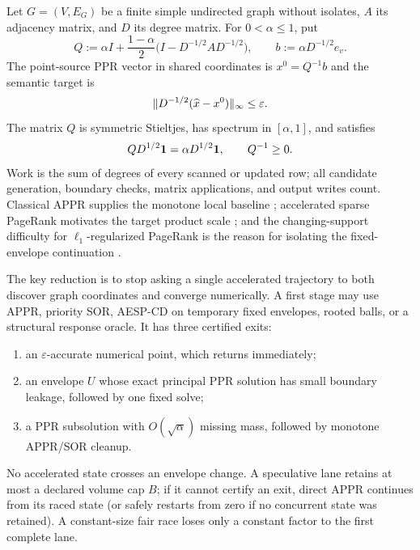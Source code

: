 Let $G=(V,E_G)$ be a finite simple undirected graph without isolates,
$A$ its adjacency matrix, and $D$ its degree matrix.  For
$0<\alpha\leq1$, put
\begin{equation}
 Q:=\alpha I+\frac{1-\alpha}{2}
      \bigl(I-D^{-1/2}AD^{-1/2}\bigr),
 \qquad b:=\alpha D^{-1/2}e_v.
 \label{eq:short-q}
\end{equation}
The point-source PPR vector in shared coordinates is $x^0=Q^{-1}b$ and the
semantic target is
\begin{equation}
 \lVert D^{-1/2}(\widehat x-x^0)\rVert_\infty\leq\varepsilon.
 \label{eq:short-target}
\end{equation}
The matrix $Q$ is symmetric Stieltjes, has spectrum in $[\alpha,1]$, and
satisfies
\begin{equation}
 QD^{1/2}\mathbf{1}=\alpha D^{1/2}\mathbf{1},
 \qquad Q^{-1}\geq0.
 \label{eq:short-comparison}
\end{equation}
Work is the sum of degrees of every scanned or updated row; all candidate
generation, boundary checks, matrix applications, and output writes count.
Classical APPR supplies the monotone local baseline
\citep{andersen2007using}; accelerated sparse PageRank motivates the target
product scale \citep{martinezrubio2023accelerated,huang2025accelerated}; and
the changing-support difficulty for $\ell_1$-regularized PageRank is the
reason for isolating the fixed-envelope continuation
\citep{fountoulakis2026complexity}.

The key reduction is to stop asking a single accelerated trajectory to both
discover graph coordinates and converge numerically.  A first stage may use
APPR, priority SOR, AESP-CD on temporary fixed envelopes, rooted balls, or a
structural response oracle.  It has three certified exits:
\begin{enumerate}[leftmargin=2.2em]
\item an $\varepsilon$-accurate numerical point, which returns immediately;
\item an envelope $U$ whose exact principal PPR solution has small boundary
  leakage, followed by one fixed solve;
\item a PPR subsolution with $O(\sqrt\alpha)$ missing mass, followed by
  monotone APPR/SOR cleanup.
\end{enumerate}
No accelerated state crosses an envelope change.  A speculative lane retains
at most a declared volume cap $B$; if it cannot certify an exit, direct APPR
continues from its raced state (or safely restarts from zero if no concurrent
state was retained).  A constant-size fair race loses only a constant factor
to the first complete lane.

